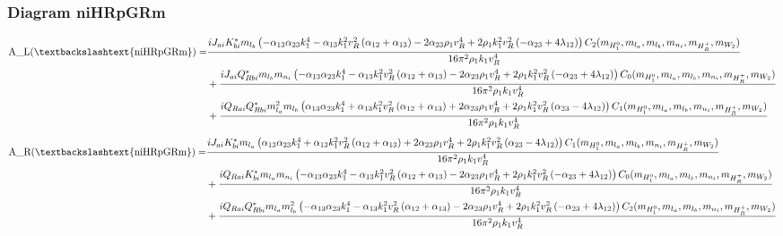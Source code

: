 \documentclass{article}
\begin{document}
\subsubsection{Diagram niHRpGRm}
\begin{align*}
\mathtt{\text{A\_L(\textbackslashtext\{niHRpGRm\})}} = & \frac{i J_{ai} K_{bi}^* m_{l_b} \left(- \alpha_{13} \alpha_{23} k_{1}^{4} - \alpha_{13} k_{1}^{2} v_{R}^{2} \left(\alpha_{12} + \alpha_{13}\right) - 2 \alpha_{23} \rho_{1} v_{R}^{4} + 2 \rho_{1} k_{1}^{2} v_{R}^{2} \left(- \alpha_{23} + 4 \lambda_{12}\right)\right) C_2(m_{H_1^0}, m_{l_a}, m_{l_b}, m_{n_i}, m_{H_R^+}, m_{W_2})}{16 \pi^{2} \rho_{1} k_{1} v_{R}^{4}} \\
& + \frac{i J_{ai} Q_{Rbi}^* m_{l_b} m_{n_i} \left(- \alpha_{13} \alpha_{23} k_{1}^{4} - \alpha_{13} k_{1}^{2} v_{R}^{2} \left(\alpha_{12} + \alpha_{13}\right) - 2 \alpha_{23} \rho_{1} v_{R}^{4} + 2 \rho_{1} k_{1}^{2} v_{R}^{2} \left(- \alpha_{23} + 4 \lambda_{12}\right)\right) C_0(m_{H_1^0}, m_{l_a}, m_{l_b}, m_{n_i}, m_{H_R^+}, m_{W_2})}{16 \pi^{2} \rho_{1} k_{1} v_{R}^{4}} \\
& + \frac{i Q_{Rai} Q_{Rbi}^* m_{l_a}^{2} m_{l_b} \left(\alpha_{13} \alpha_{23} k_{1}^{4} + \alpha_{13} k_{1}^{2} v_{R}^{2} \left(\alpha_{12} + \alpha_{13}\right) + 2 \alpha_{23} \rho_{1} v_{R}^{4} + 2 \rho_{1} k_{1}^{2} v_{R}^{2} \left(\alpha_{23} - 4 \lambda_{12}\right)\right) C_1(m_{H_1^0}, m_{l_a}, m_{l_b}, m_{n_i}, m_{H_R^+}, m_{W_2})}{16 \pi^{2} \rho_{1} k_{1} v_{R}^{4}} 
\end{align*}
\begin{align*}
\mathtt{\text{A\_R(\textbackslashtext\{niHRpGRm\})}} = & \frac{i J_{ai} K_{bi}^* m_{l_a} \left(\alpha_{13} \alpha_{23} k_{1}^{4} + \alpha_{13} k_{1}^{2} v_{R}^{2} \left(\alpha_{12} + \alpha_{13}\right) + 2 \alpha_{23} \rho_{1} v_{R}^{4} + 2 \rho_{1} k_{1}^{2} v_{R}^{2} \left(\alpha_{23} - 4 \lambda_{12}\right)\right) C_1(m_{H_1^0}, m_{l_a}, m_{l_b}, m_{n_i}, m_{H_R^+}, m_{W_2})}{16 \pi^{2} \rho_{1} k_{1} v_{R}^{4}} \\
& + \frac{i Q_{Rai} K_{bi}^* m_{l_a} m_{n_i} \left(- \alpha_{13} \alpha_{23} k_{1}^{4} - \alpha_{13} k_{1}^{2} v_{R}^{2} \left(\alpha_{12} + \alpha_{13}\right) - 2 \alpha_{23} \rho_{1} v_{R}^{4} + 2 \rho_{1} k_{1}^{2} v_{R}^{2} \left(- \alpha_{23} + 4 \lambda_{12}\right)\right) C_0(m_{H_1^0}, m_{l_a}, m_{l_b}, m_{n_i}, m_{H_R^+}, m_{W_2})}{16 \pi^{2} \rho_{1} k_{1} v_{R}^{4}} \\
& + \frac{i Q_{Rai} Q_{Rbi}^* m_{l_a} m_{l_b}^{2} \left(- \alpha_{13} \alpha_{23} k_{1}^{4} - \alpha_{13} k_{1}^{2} v_{R}^{2} \left(\alpha_{12} + \alpha_{13}\right) - 2 \alpha_{23} \rho_{1} v_{R}^{4} + 2 \rho_{1} k_{1}^{2} v_{R}^{2} \left(- \alpha_{23} + 4 \lambda_{12}\right)\right) C_2(m_{H_1^0}, m_{l_a}, m_{l_b}, m_{n_i}, m_{H_R^+}, m_{W_2})}{16 \pi^{2} \rho_{1} k_{1} v_{R}^{4}} 
\end{align*}
\end{document}
